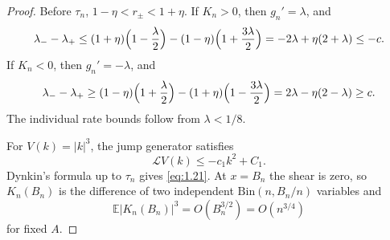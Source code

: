\documentclass[11pt,reqno]{amsart}
\theoremstyle{definition}
\theoremstyle{remark}
\numberwithin{equation}{section}
\newcommand{\E}{\mathbb E}
\begin{document}
\begin{proof}
Before \(\tau_n\), \(1-\eta<r_\pm<1+\eta\).  If \(K_n>0\),
then \(g_n'=\lambda\), and
\[
\lambda_- -\lambda_+
\le
(1+\eta)\Bigl(1-\frac\lambda2\Bigr)
-
(1-\eta)\Bigl(1+\frac{3\lambda}{2}\Bigr)
=
-2\lambda+\eta(2+\lambda)\le-c.
\]
If \(K_n<0\), then \(g_n'=-\lambda\), and
\[
\lambda_- -\lambda_+
\ge
(1-\eta)\Bigl(1+\frac\lambda2\Bigr)
-
(1+\eta)\Bigl(1-\frac{3\lambda}{2}\Bigr)
=
2\lambda-\eta(2-\lambda)\ge c.
\]
The individual rate bounds follow from \(\lambda<1/8\).

For \(V(k)=|k|^3\), the jump generator satisfies
\begin{equation}
\mathcal LV(k)\le-c_1k^2+C_1.
\label{eq:1.24}
\end{equation}
Dynkin's formula up to \(\tau_n\) gives \eqref{eq:1.21}.  At \(x=B_n\) the shear
is zero, so \(K_n(B_n)\) is the difference of two independent
\(\mathrm{Bin}(n,B_n/n)\) variables and
\[
\E|K_n(B_n)|^3=O(B_n^{3/2})=O(n^{3/4})
\]
for fixed \(A\).


\end{proof}
\end{document}

